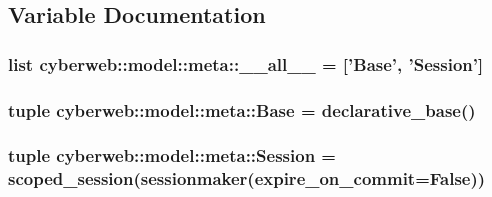 \subsection{\-Variable \-Documentation}
\hypertarget{namespacecyberweb_1_1model_1_1meta_aace23f3dc175f2b2c3517810f2bb6891}{
\subsubsection[{\-\_\-\-\_\-all\-\_\-\-\_\-}]{\setlength{\rightskip}{0pt plus 5cm}list {\bf cyberweb\-::model\-::meta\-::\-\_\-\-\_\-all\-\_\-\-\_\-} = \mbox{[}'{\bf \-Base}', '{\bf \-Session}'\mbox{]}}}\label{namespacecyberweb_1_1model_1_1meta_aace23f3dc175f2b2c3517810f2bb6891}
\hypertarget{namespacecyberweb_1_1model_1_1meta_aad31dc5abbb407ce088d01bbc854846f}{
\subsubsection[{\-Base}]{\setlength{\rightskip}{0pt plus 5cm}tuple {\bf cyberweb\-::model\-::meta\-::\-Base} = declarative\-\_\-base()}}\label{namespacecyberweb_1_1model_1_1meta_aad31dc5abbb407ce088d01bbc854846f}
\hypertarget{namespacecyberweb_1_1model_1_1meta_a6f814f2da18f69a468b99f93148d73ff}{
\subsubsection[{\-Session}]{\setlength{\rightskip}{0pt plus 5cm}tuple {\bf cyberweb\-::model\-::meta\-::\-Session} = scoped\-\_\-session(sessionmaker(expire\-\_\-on\-\_\-commit=\-False))}}\label{namespacecyberweb_1_1model_1_1meta_a6f814f2da18f69a468b99f93148d73ff}

